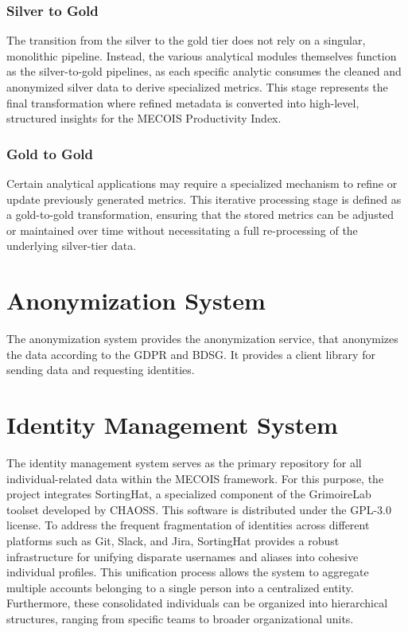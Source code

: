 \subsubsection{Silver to Gold}
\label{subsubsec:silver2gold}

The transition from the silver to the gold tier does not rely on a singular, monolithic pipeline. Instead, the various analytical modules themselves function as the silver-to-gold pipelines, as each specific analytic consumes the cleaned and anonymized silver data to derive specialized metrics. This stage represents the final transformation where refined metadata is converted into high-level, structured insights for the MECOIS Productivity Index.

\subsubsection{Gold to Gold}
\label{subsubsec:gold2gold}

Certain analytical applications may require a specialized mechanism to refine or update previously generated metrics. This iterative processing stage is defined as a gold-to-gold transformation, ensuring that the stored metrics can be adjusted or maintained over time without necessitating a full re-processing of the underlying silver-tier data.

\section{Anonymization System}
\label{sec:anonymization_system}

The anonymization system provides the anonymization service, that anonymizes the data according to the \ac{GDPR} and \ac{BDSG}.
It provides a client library for sending data and requesting identities. 

\section{Identity Management System}
\label{sec:identity_management_system}

The identity management system serves as the primary repository for all individual-related data within the MECOIS framework. For this purpose, the project integrates SortingHat, a specialized component of the GrimoireLab toolset developed by CHAOSS. This software is distributed under the GPL-3.0 license. To address the frequent fragmentation of identities across different platforms such as Git, Slack, and Jira, SortingHat provides a robust infrastructure for unifying disparate usernames and aliases into cohesive individual profiles. This unification process allows the system to aggregate multiple accounts belonging to a single person into a centralized entity. Furthermore, these consolidated individuals can be organized into hierarchical structures, ranging from specific teams to broader organizational units.

